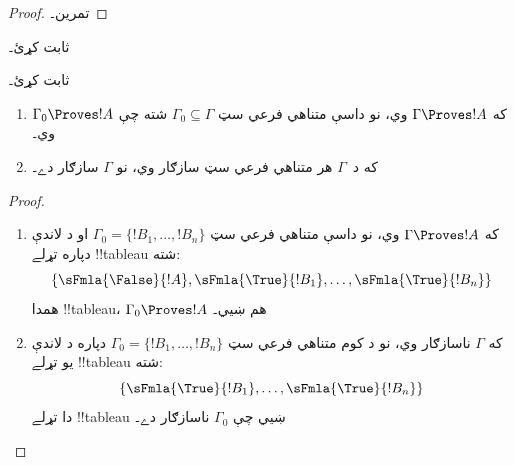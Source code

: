 \documentclass[../../../include/open-logic-section]{subfiles}
\begin{document}
\begin{proof}
تمرين۔
\end{proof}

\begin{prob}
 ثابت کړئ۔
\end{prob}
\tagendprob

\begin{prob}
 ثابت کړئ۔
\end{prob}
\tagendprob

\begin{prop}[تراکم]
  \begin{enumerate}
  \item که $\Gamma \Proves !A$ وي، نو داسې متناهي فرعي سټ
    $\Gamma_0 \subseteq \Gamma$ شته چې $\Gamma_0 \Proves !A$ وي۔
  \item که د~$\Gamma$ هر متناهي فرعي سټ سازګار وي، نو $\Gamma$
    سازګار دے۔
  \end{enumerate}
\end{prop}

\begin{proof}
  \begin{enumerate}
    \item که $\Gamma \Proves !A$ وي، نو داسې متناهي فرعي سټ
      $\Gamma_0 = \{!B_1, \dots, !B_n\}$ او د لاندې دپاره تړلے
      !!{tableau} شته:
      \[
      \{\sFmla{\False}{!A}, \sFmla{\True}{!B_1}, \dots, \sFmla{\True}{!B_n}\}
      \]
      همدا !!{tableau}، $\Gamma_0 \Proves !A$ هم ښيي۔
    \item که $\Gamma$ ناسازګار وي، نو د کوم متناهي فرعي سټ
      $\Gamma_0 = \{!B_1, \dots, !B_n\}$ دپاره د لاندې يو تړلے
      !!{tableau} شته:
      \[
      \{\sFmla{\True}{!B_1}, \dots, \sFmla{\True}{!B_n}\}
      \]
      دا تړلے !!{tableau} ښيي چې $\Gamma_0$ ناسازګار دے۔
  \end{enumerate}
\end{proof}
\end{document}
